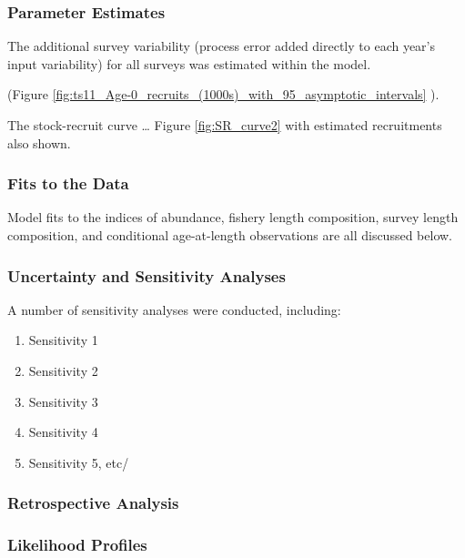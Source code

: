 \documentclass[12pt,]{article}
\begin{document}
\subsubsection{Parameter Estimates}\label{parameter-estimates}

The additional survey variability (process error added directly to each
year's input variability) for all surveys was estimated within the
model.

(Figure
\ref{fig:ts11_Age-0_recruits_(1000s)_with_95_asymptotic_intervals} ).

The stock-recruit curve \ldots{} Figure \ref{fig:SR_curve2} with
estimated recruitments also shown.

\subsubsection{Fits to the Data}\label{fits-to-the-data}

Model fits to the indices of abundance, fishery length composition,
survey length composition, and conditional age-at-length observations
are all discussed below.

\subsubsection{Uncertainty and Sensitivity
Analyses}\label{uncertainty-and-sensitivity-analyses}

A number of sensitivity analyses were conducted, including:

\begin{enumerate}

  \item Sensitivity 1
  
  \item Sensitivity 2
  
  \item Sensitivity 3
  
  \item Sensitivity 4
  
  \item Sensitivity 5, etc/
  
  
\end{enumerate}

\subsubsection{Retrospective Analysis}\label{retrospective-analysis}

\subsubsection{Likelihood Profiles}\label{likelihood-profiles}
\end{document}
